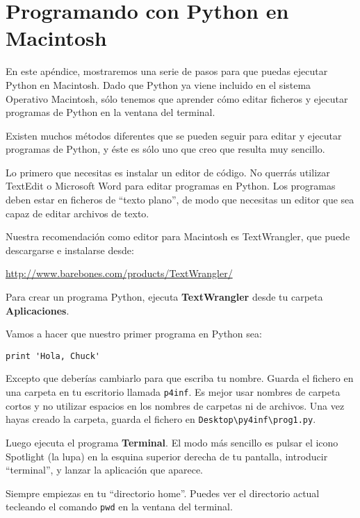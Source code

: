 
\chapter{Programando con Python en Macintosh}

En este apéndice, mostraremos una serie de pasos
para que puedas ejecutar Python en Macintosh. Dado que Python
ya viene incluido en el sistema Operativo Macintosh, sólo
tenemos que aprender cómo editar ficheros y ejecutar programas
de Python en la ventana del terminal.

Existen muchos métodos diferentes que se pueden seguir para editar y ejecutar
programas de Python, y éste es sólo uno que creo que
resulta muy sencillo.

Lo primero que necesitas es instalar un editor de código. No
querrás utilizar TextEdit o Microsoft Word para editar
programas en Python. Los programas deben estar en ficheros de ``texto plano'',
de modo que necesitas un editor que sea capaz de
editar archivos de texto.

Nuestra recomendación como editor para Macintosh es TextWrangler, que
puede descargarse e instalarse desde:

\url{http://www.barebones.com/products/TextWrangler/}

Para crear un programa Python, ejecuta
{\bf TextWrangler} desde tu carpeta {\bf Aplicaciones}.

Vamos a hacer que nuestro primer programa en Python sea:

\beforeverb
\begin{verbatim}
print 'Hola, Chuck'
\end{verbatim}
\afterverb
%
Excepto que deberías cambiarlo para que escriba tu nombre.
Guarda el fichero en una carpeta en tu escritorio llamada
{\tt p4inf}. Es mejor usar nombres de carpeta cortos
y no utilizar espacios en los nombres de carpetas ni de archivos.
Una vez hayas creado la carpeta, guarda el fichero
en {\tt Desktop{\textbackslash}py4inf{\textbackslash}prog1.py}.

Luego ejecuta el programa {\bf Terminal}. El modo más sencillo es
pulsar el icono Spotlight (la lupa) en la esquina superior
derecha de tu pantalla, introducir ``terminal'', y lanzar la
aplicación que aparece.

Siempre empiezas en tu ``directorio home''. Puedes ver el directorio
actual tecleando el comando {\tt pwd} en la ventana del terminal.

